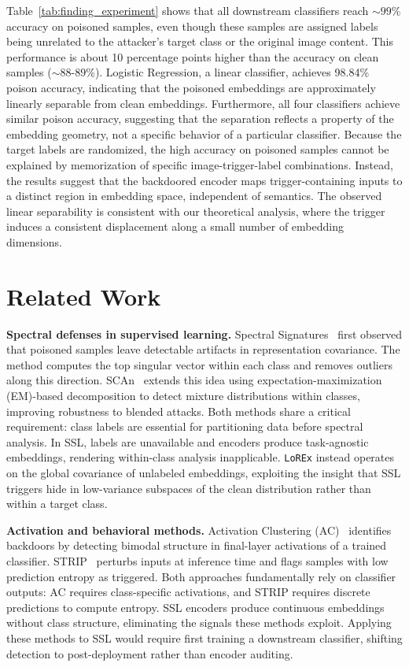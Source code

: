 \documentclass[letterpaper,twocolumn,10pt]{article}
\begin{document}
Table~\ref{tab:finding_experiment} shows that all downstream classifiers reach ${\sim}99\%$ accuracy on poisoned samples, even though these samples are assigned labels being unrelated to the attacker's target class or the original image content. 
This performance is about 10 percentage points higher than the accuracy on clean samples (${\sim}88$-$89\%$). Logistic Regression, a linear classifier, achieves 98.84\% poison accuracy, indicating that the poisoned embeddings are approximately linearly separable from clean embeddings. Furthermore, all four classifiers achieve similar poison accuracy, suggesting that the separation reflects a property of the embedding geometry, not a specific behavior of a particular classifier.
Because the target labels are randomized, the high accuracy on poisoned samples cannot be explained by memorization of specific image-trigger-label combinations. 
Instead, the results suggest that the backdoored encoder maps trigger-containing inputs to a distinct region in embedding space, independent of semantics. 
The observed linear separability is consistent with our theoretical analysis, where the trigger induces a consistent displacement along a small number of embedding dimensions.


\section{Related Work}
\label{Section7}

\par \textbf{Spectral defenses in supervised learning.}
Spectral Signatures~\cite{tran2018spectral} first observed that poisoned samples leave detectable artifacts in representation covariance. The method computes the top singular vector within each class and removes outliers along this direction. SCAn~\cite{tang2021demon} extends this idea using expectation-maximization (EM)-based decomposition to detect mixture distributions within classes, improving robustness to blended attacks. Both methods share a critical requirement: class labels are essential for partitioning data before spectral analysis. In SSL, labels are unavailable and encoders produce task-agnostic embeddings, rendering within-class analysis inapplicable. \texttt{LoREx} instead operates on the global covariance of unlabeled embeddings, exploiting the insight that SSL triggers hide in low-variance subspaces of the clean distribution rather than within a target class.

\par \textbf{Activation and behavioral methods.}
Activation Clustering (AC)~\cite{chen2018detecting} identifies backdoors by detecting bimodal structure in final-layer activations of a trained classifier. STRIP~\cite{gao2019strip} perturbs inputs at inference time and flags samples with low prediction entropy as triggered. Both approaches fundamentally rely on classifier outputs: AC requires class-specific activations, and STRIP requires discrete predictions to compute entropy. SSL encoders produce continuous embeddings without class structure, eliminating the signals these methods exploit. Applying these methods to SSL would require first training a downstream classifier, shifting detection to post-deployment rather than encoder auditing.
\end{document}
